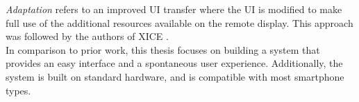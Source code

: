 \emph{Adaptation} refers to an improved UI transfer where the UI is modified to make full use of the additional resources available on the remote display.
This approach was followed by the authors of XICE \citep{Arthur:2011:xice}.
\\
\linebreak
In comparison to prior work, this thesis focuses on building a system that provides an easy interface and a spontaneous user experience.
Additionally, the system is built on standard hardware, and is compatible with most smartphone types.



